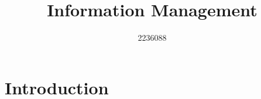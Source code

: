 \documentclass[english]{article}
\begin{document}
\title{Information Management}
\author{2236088}

\maketitle

\newpage

\tableofcontents{}

\newpage

\section{Introduction}



\newpage

\printbibliography

\newpage

\begin{appendices}


\end{appendices}
\end{document}

